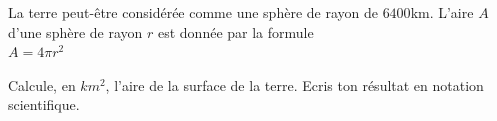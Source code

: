 %
%
La terre peut-être considérée comme une sphère de rayon de $6400$km. L'aire $A$ d'une sphère de rayon $r$ est donnée par la formule \\  $A=4\pi r^2$

	Calcule, en $km^2$, l'aire de la surface de la terre. Ecris ton résultat en notation scientifique.


